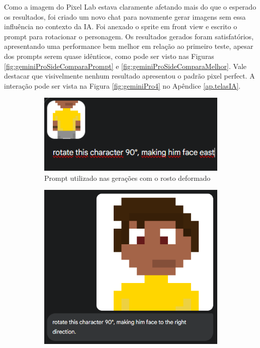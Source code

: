 Como a imagem do Pixel Lab estava claramente afetando mais do que o esperado os resultados, foi criado um novo chat para novamente gerar imagens sem essa influência no contexto da IA. Foi anexado o sprite em front view e escrito o prompt para rotacionar o personagem. Os resultados gerados foram satisfatórios, apresentando uma performance bem melhor em relação ao primeiro teste, apesar dos prompts serem quase idênticos, como pode ser visto nas Figuras \ref{fig:geminiProSideComparaPrompt} e \ref{fig:geminiProSideComparaMelhor}. Vale destacar que visivelmente nenhum resultado apresentou o padrão pixel perfect. A interação pode ser vista na Figura \ref{fig:geminiPro4} no Apêndice \ref{ap.telasIA}.

\begin{figure}[htbp]
    \centering
    \caption{\small Comparação dos prompts utilizados para geração do sprite em side view usando apenas o front view de referência no Gemini Pro}
    \label{fig:geminiProSideComparaPrompt}
    \begin{subfigure}{0.45\linewidth}
        \includegraphics[width=1\linewidth]{figs/geminiPro/chat1/prompt.PNG}
        \caption{\small Prompt utilizado nas gerações com o rosto deformado}
        \label{fig:geminiProSideCompararPrompt1}
    \end{subfigure}\hfill
    \begin{subfigure}{0.45 \linewidth}
        \centering
        \includegraphics[width=1\linewidth]{figs/geminiPro/chat2/prompt.PNG}

\end{subfigure}
\end{figure}

